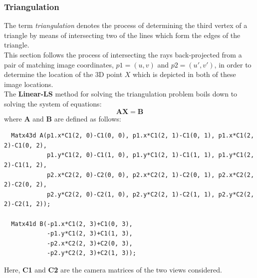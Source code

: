 \documentclass[12pt,a4paper,twoside,openright]{report}
\begin{document}
\subsubsection{Triangulation}
The term \emph{triangulation} denotes the process of determining the third vertex of a triangle by means of intersecting two of the lines which form the edges of the triangle.\\
This section follows the process of intersecting the rays back-projected from a pair of matching image coordinates, $p1=(u, v)$ and $p2=(u', v')$, in order to determine the location of the 3D point $X$ which is depicted in both of these image locations.\\
\linebreak
The \textbf{Linear-LS}\cite[p.~8]{Hartley96triangulation} method for solving the triangulation problem boils down to solving the system of equations:
\begin{equation}
\mathbf{AX} = \mathbf{B} 
\end{equation}
where \textbf{A} and \textbf{B} are defined as follows:
\begin{verbatim}
  Matx43d A(p1.x*C1(2, 0)-C1(0, 0), p1.x*C1(2, 1)-C1(0, 1), p1.x*C1(2, 2)-C1(0, 2),
            p1.y*C1(2, 0)-C1(1, 0), p1.y*C1(2, 1)-C1(1, 1), p1.y*C1(2, 2)-C1(1, 2),
            p2.x*C2(2, 0)-C2(0, 0), p2.x*C2(2, 1)-C2(0, 1), p2.x*C2(2, 2)-C2(0, 2),
            p2.y*C2(2, 0)-C2(1, 0), p2.y*C2(2, 1)-C2(1, 1), p2.y*C2(2, 2)-C2(1, 2));

  Matx41d B(-p1.x*C1(2, 3)+C1(0, 3),
            -p1.y*C1(2, 3)+C1(1, 3),
            -p2.x*C2(2, 3)+C2(0, 3),
            -p2.y*C2(2, 3)+C2(1, 3));
\end{verbatim}
Here, \textbf{C1} and \textbf{C2} are the camera matrices of the two views considered.
\end{document}
